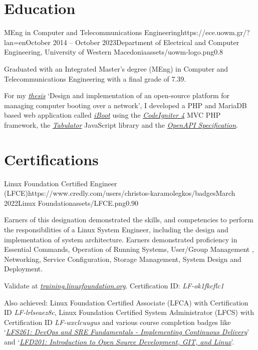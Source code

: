 \documentclass{mycv}
\begin{document}
	\section{Education}

	\begin{EntryDatedLogo}{MEng in Computer and Telecommunications Engineering}{https://ece.uowm.gr/?lan=en}{October 2014 -- October 2023}{Department of Electrical and Computer Engineering, University of Western Macedonia}{assets/uowm-logo.png}{0.8}
		\begin{Itemize}
			\item Graduated with an Integrated Master’s degree (MEng) in Computer and Telecommunications Engineering with a final grade of 7.39.
			\item For my \href{https://github.com/ChrisKar96/Thesis}{\textit{thesis}} `Design and implementation of an open-source platform for managing computer booting over a network', I developed a PHP and MariaDB based web application called \href{https://github.com/ChrisKar96/iBoot-Thesis}{\textit{iBoot}} using the \href{https://codeigniter.com/}{\textit{CodeIgniter 4}} MVC PHP framework, the \href{https://tabulator.info/}{\textit{Tabulator}} JavaScript library and the \href{https://swagger.io/specification/}{\textit{OpenAPI Specification}}.
   \end{Itemize}
	\end{EntryDatedLogo}

	\section{Certifications}
    \begin{EntryDatedLogo}{Linux Foundation Certified Engineer (LFCE)}{https://www.credly.com/users/christos-karamolegkos/badges}{March 2022}{Linux Foundation}{assets/LFCE.png}{0.90}
		\begin{Itemize}
			\item Earners of this designation demonstrated the skills, and competencies to perform the responsibilities of a Linux System Engineer, including the design and implementation of system architecture. Earners demonstrated proficiency in Essential Commands, Operation of Running Systems, User/Group Management , Networking, Service Configuration, Storage Management, System Design and Deployment.
			\item Validate at \href{https://training.linuxfoundation.org/certification/verify-linux-certifications}{\textit{training.linuxfoundation.org}}. Certification ID: \textit{LF-ok1fkcflc1}
			\item Also achieved: Linux Foundation Certified Associate (LFCA) with Certification ID \textit{LF-lrlseaez8c}, Linux Foundation Certified System Administrator (LFCS) with Certification ID \textit{LF-wxclcuugus} and various course completion badges like `\href{https://www.credly.com/badges/19ff66ca-2e10-4e1b-90a9-1c1ac6132878}{\textit{LFS261: DevOps and SRE Fundamentals - Implementing Continuous Delivery}}' and   `\href{https://www.credly.com/badges/1fc7edfc-227e-4e93-ac46-297ab05c27db}{\textit{LFD201: Introduction to Open Source Development, GIT, and Linux}}'.
		\end{Itemize}
	\end{EntryDatedLogo}
\end{document}
